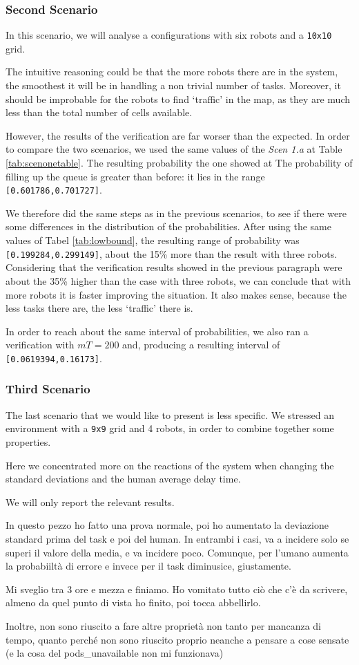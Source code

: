 \subsubsection{Second Scenario} \label{secondscenario}
In this scenario, we will analyse a configurations with six robots and a \texttt{10x10} grid.

The intuitive reasoning could be that the more robots there are in the system, the smoothest it will be in handling a non trivial number of tasks. Moreover, it should be improbable for the robots to find `traffic' in the map, as they are much less than the total number of cells available.

However, the results of the verification are far worser than the expected. In order to compare the two scenarios, we used the same values of the \emph{Scen 1.a} at Table \ref{tab:scenonetable}. The resulting probability the one showed at  The probability of filling up the queue is greater than before: it lies in the range \texttt{[0.601786,0.701727]}.

We therefore did the same steps as in the previous scenarios, to see if there were some differences in the distribution of the probabilities. After using the same values of Tabel \ref{tab:lowbound}, the resulting range of probability was \texttt{[0.199284,0.299149]}, about the 15\% more than the result with three robots. Considering that the verification results showed in the previous paragraph were about the 35\% higher than the case with three robots, we can conclude that with more robots it is faster improving the situation. It also makes sense, because the less tasks there are, the less `traffic' there is.

In order to reach about the same interval of probabilities, we also ran a verification with $mT = 200$ and, producing a resulting interval of \\ \texttt{[0.0619394,0.16173]}.

\subsubsection{Third Scenario}
The last scenario that we would like to present is less specific. We stressed an environment with a \texttt{9x9} grid and 4 robots, in order to combine together some properties.

Here we concentrated more on the reactions of the system when changing the standard deviations and the human average delay time.

We will only report the relevant results.

In questo pezzo ho fatto una prova normale, poi ho aumentato la deviazione standard prima del task e poi del human. In entrambi i casi, va a incidere solo se superi il valore della media, e va incidere poco. Comunque, per l'umano aumenta la probabiiltà di errore e invece per il task diminusice, giustamente.

Mi sveglio tra 3 ore e mezza e finiamo. Ho vomitato tutto ciò che c'è da scrivere, almeno da quel punto di vista ho finito, poi tocca abbellirlo.

Inoltre, non sono riuscito a fare altre proprietà non tanto per mancanza di tempo, quanto perché non sono riuscito proprio neanche a pensare a cose sensate (e la cosa del pods\_unavailable non mi funzionava)